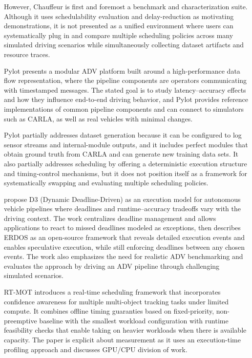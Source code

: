However, Chauffeur is first and foremost a benchmark and characterization suite. Although it uses schedulability evaluation and delay-reduction as motivating demonstrations, it is not presented as a unified environment where users can systematically plug in and compare multiple scheduling policies across many simulated driving scenarios while simultaneously collecting dataset artifacts and resource traces.

Pylot \cite{Gog2021Pylot:Vehicles} presents a modular ADV platform built around a high-performance data flow representation, where the pipeline components are operators communicating with timestamped messages. The stated goal is to study latency–accuracy effects and how they influence end-to-end driving behavior, and Pylot provides reference implementations of common pipeline components and can connect to simulators such as CARLA, as well as real vehicles with minimal changes. 

Pylot partially addresses dataset generation because it can be configured to log sensor streams and internal-module outputs, and it includes perfect modules that obtain ground truth from CARLA and can generate new training data sets. It also partially addresses scheduling by offering a deterministic execution structure and timing-control mechanisms, but it does not position itself as a framework for systematically swapping and evaluating multiple scheduling policies.

 propose D3 (Dynamic Deadline-Driven) as an execution model for autonomous vehicle pipelines where deadlines and runtime–accuracy tradeoffs vary with the driving context. The work centralizes deadline management and allows applications to react to missed deadlines modeled as exceptions, then describes ERDOS as an open-source framework that reveals detailed execution events and enables speculative execution, while still enforcing deadlines between any chosen events. The work also emphasizes the need for realistic ADV benchmarking and evaluates the approach by driving an ADV pipeline through challenging simulated scenarios.

RT-MOT \cite{Kang2022RTMOT:RTSS} introduces a real-time scheduling framework that incorporates confidence awareness for multiple multi-object tracking tasks under limited compute. It combines offline timing guaranties based on fixed-priority, non-preemptive baseline with the smallest workload configuration with runtime feasibility checks that enable taking on heavier workloads when there is available capacity. The paper is explicit about measurement as it uses an execution-time profiling approach and discusses GPU/CPU division of work.

